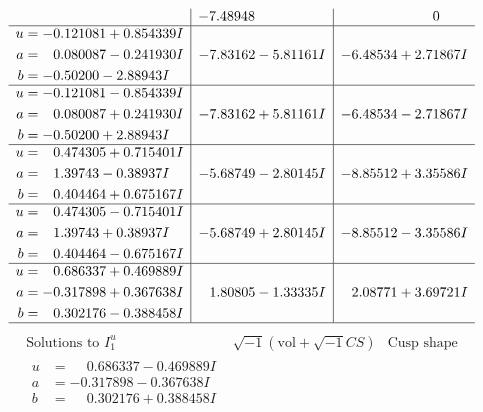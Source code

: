 \documentclass[1p]{elsarticle_modified}
\theoremstyle{definition}
\newcommand{\I}{\sqrt{-1}}
\begin{document}
$$\begin{array}{c|c|c}
 & -7.48948\phantom{ +0.000000I} & \phantom{-0.000000 } 0 \\ \hline\begin{aligned}
u &= -0.121081 + 0.854339 I \\
a &= \phantom{-}0.080087 - 0.241930 I \\
b &= -0.50200 - 2.88943 I\end{aligned}
 & -7.83162 - 5.81161 I & -6.48534 + 2.71867 I \\ \hline\begin{aligned}
u &= -0.121081 - 0.854339 I \\
a &= \phantom{-}0.080087 + 0.241930 I \\
b &= -0.50200 + 2.88943 I\end{aligned}
 & -7.83162 + 5.81161 I & -6.48534 - 2.71867 I \\ \hline\begin{aligned}
u &= \phantom{-}0.474305 + 0.715401 I \\
a &= \phantom{-}1.39743 - 0.38937 I \\
b &= \phantom{-}0.404464 + 0.675167 I\end{aligned}
 & -5.68749 - 2.80145 I & -8.85512 + 3.35586 I \\ \hline\begin{aligned}
u &= \phantom{-}0.474305 - 0.715401 I \\
a &= \phantom{-}1.39743 + 0.38937 I \\
b &= \phantom{-}0.404464 - 0.675167 I\end{aligned}
 & -5.68749 + 2.80145 I & -8.85512 - 3.35586 I \\ \hline\begin{aligned}
u &= \phantom{-}0.686337 + 0.469889 I \\
a &= -0.317898 + 0.367638 I \\
b &= \phantom{-}0.302176 - 0.388458 I\end{aligned}
 & \phantom{-}1.80805 - 1.33335 I & \phantom{-}2.08771 + 3.69721 I\\
 \hline 
 \end{array}$$\newpage$$\begin{array}{c|c|c}  
\text{Solutions to }I^u_{1}& \I (\text{vol} + \sqrt{-1}CS) & \text{Cusp shape}\\
 \hline 
\begin{aligned}
u &= \phantom{-}0.686337 - 0.469889 I \\
a &= -0.317898 - 0.367638 I \\
b &= \phantom{-}0.302176 + 0.388458 I\end{aligned}

\end{array}$$
\end{document}
